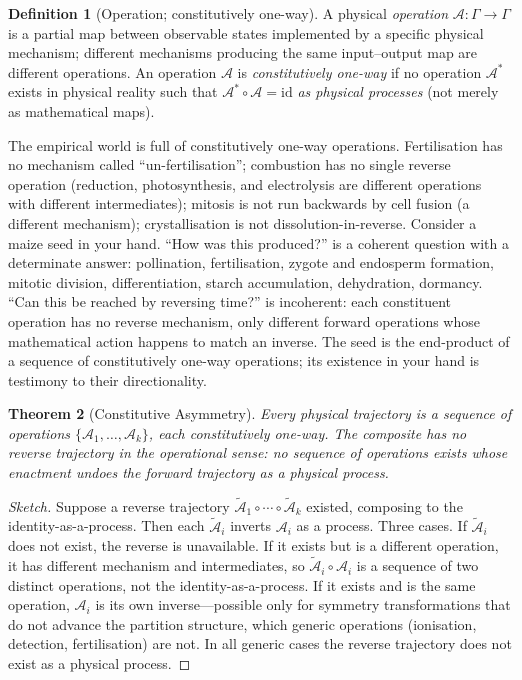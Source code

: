 \documentclass[11pt,a4paper]{article}
\theoremstyle{thmstyle}
\newtheorem{theorem}{Theorem}[section]
\theoremstyle{definition}
\newtheorem{definition}[theorem]{Definition}
\theoremstyle{remark}
\newcommand{\Op}{\mathcal{A}}
\begin{document}
\begin{definition}[Operation; constitutively one-way]
\label{def:operation}
A physical \emph{operation} $\Op:\Gamma\to\Gamma$ is a partial map
between observable states implemented by a specific physical mechanism;
different mechanisms producing the same input--output map are different
operations. An operation $\Op$ is \emph{constitutively one-way} if no
operation $\Op^{*}$ exists in physical reality such that
$\Op^{*}\circ\Op=\mathrm{id}$ \emph{as physical processes} (not merely as
mathematical maps).
\end{definition}

The empirical world is full of constitutively one-way operations.
Fertilisation has no mechanism called ``un-fertilisation''; combustion
has no single reverse operation (reduction, photosynthesis, and
electrolysis are different operations with different intermediates);
mitosis is not run backwards by cell fusion (a different mechanism);
crystallisation is not dissolution-in-reverse. Consider a maize seed in
your hand. ``How was this produced?'' is a coherent question with a
determinate answer: pollination, fertilisation, zygote and endosperm
formation, mitotic division, differentiation, starch accumulation,
dehydration, dormancy. ``Can this be reached by reversing time?'' is
incoherent: each constituent operation has no reverse mechanism, only
different forward operations whose mathematical action happens to match
an inverse. The seed is the end-product of a sequence of constitutively
one-way operations; its existence in your hand is testimony to their
directionality.

\begin{theorem}[Constitutive Asymmetry]
\label{thm:constitutive}
Every physical trajectory is a sequence of operations
$\{\Op_{1},\dots,\Op_{k}\}$, each constitutively one-way. The composite
has no reverse trajectory in the operational sense: no sequence of
operations exists whose enactment undoes the forward trajectory as a
physical process.
\end{theorem}

\begin{proof}[Sketch]
Suppose a reverse trajectory
$\widetilde{\Op}_{1}\circ\cdots\circ\widetilde{\Op}_{k}$ existed,
composing to the identity-as-a-process. Then each $\widetilde{\Op}_{i}$
inverts $\Op_{i}$ as a process. Three cases. If $\widetilde{\Op}_{i}$
does not exist, the reverse is unavailable. If it exists but is a
different operation, it has different mechanism and intermediates, so
$\widetilde{\Op}_{i}\circ\Op_{i}$ is a sequence of two distinct
operations, not the identity-as-a-process. If it exists and is the same
operation, $\Op_{i}$ is its own inverse---possible only for symmetry
transformations that do not advance the partition structure, which
generic operations (ionisation, detection, fertilisation) are not. In
all generic cases the reverse trajectory does not exist as a physical
process.
\end{proof}
\end{document}
